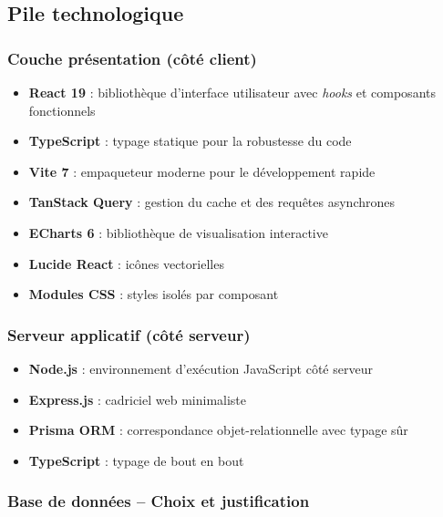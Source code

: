 \documentclass[10pt,twocolumn,a4paper]{article}
\begin{document}
\subsection{Pile technologique}

\subsubsection{Couche présentation (côté client)}

\begin{itemize}
    \item \textbf{React 19} \cite{react} : bibliothèque d'interface utilisateur avec \textit{hooks} et composants fonctionnels
    \item \textbf{TypeScript} : typage statique pour la robustesse du code
    \item \textbf{Vite 7} \cite{vite} : empaqueteur moderne pour le développement rapide
    \item \textbf{TanStack Query} \cite{tanstack} : gestion du cache et des requêtes asynchrones
    \item \textbf{ECharts 6} \cite{echarts} : bibliothèque de visualisation interactive
    \item \textbf{Lucide React} : icônes vectorielles
    \item \textbf{Modules CSS} : styles isolés par composant
\end{itemize}

\subsubsection{Serveur applicatif (côté serveur)}

\begin{itemize}
    \item \textbf{Node.js} \cite{nodejs} : environnement d'exécution JavaScript côté serveur
    \item \textbf{Express.js} \cite{expressjs} : cadriciel web minimaliste
    \item \textbf{Prisma ORM} \cite{prisma} : correspondance objet-relationnelle avec typage sûr
    \item \textbf{TypeScript} : typage de bout en bout
\end{itemize}

\subsubsection{Base de données -- Choix et justification}
\end{document}
